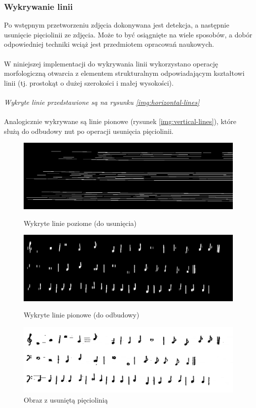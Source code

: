 \documentclass[12pt, letterpaper]{article}
\begin{document}
\subsubsection{Wykrywanie linii}
\label{subsec:line-detection}
Po wstępnym przetworzeniu zdjęcia dokonywana jest detekcja,
a następnie usunięcie pięciolinii ze zdjęcia.
Może to być osiągnięte na wiele sposobów,
a dobór odpowiedniej techniki wciąż jest przedmiotem opracowań naukowych.
\\
\\
W niniejszej implementacji do wykrywania linii wykorzystano operację
morfologiczną otwarcia z elementem strukturalnym
odpowiadającym kształtowi linii
(tj. prostokąt o dużej szerokości i małej wysokości).
\\\\
\textit{Wykryte linie przedstawione są na rysunku \ref{img:horizontal-lines}}
\\\\
Analogicznie wykrywane są linie pionowe (rysunek \ref{img:vertical-lines}), które służą do \mbox{odbudowy} nut
po operacji usunięcia pięciolinii.

\begin{figure}
    \centering
    \includegraphics[width = \imagewidth]{4_horizontal_lines}
    \caption[Horizontal lines]{Wykryte linie poziome (do usunięcia)}
    \label{img:horizontal-lines}
    \includegraphics[width = \imagewidth]{5_vertical_lines}
    \caption[Horizontal lines]{Wykryte linie pionowe (do odbudowy)}
    \label{img:vertical-lines}
    \includegraphics[width = \imagewidth]{6_erased}
    \caption[Horizontal lines]{Obraz z usuniętą pięciolinią}
    \label{img:removed-staff}
\end{figure}
\end{document}
